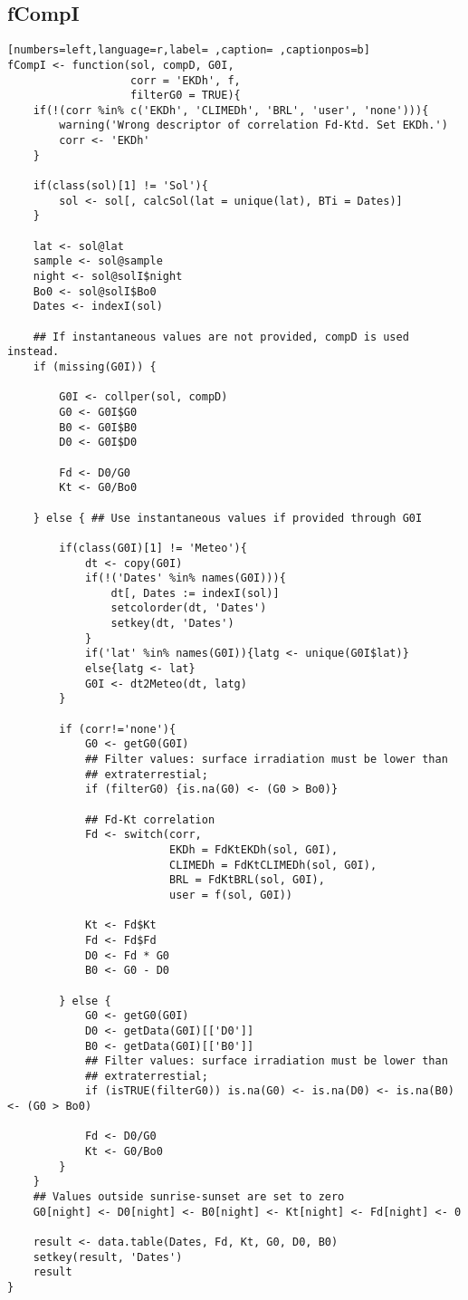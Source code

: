 \subsection{fCompI}
\label{sec:org1c50b28}
\begin{lstlisting}[numbers=left,language=r,label= ,caption= ,captionpos=b]
fCompI <- function(sol, compD, G0I,
                   corr = 'EKDh', f,
                   filterG0 = TRUE){
    if(!(corr %in% c('EKDh', 'CLIMEDh', 'BRL', 'user', 'none'))){
        warning('Wrong descriptor of correlation Fd-Ktd. Set EKDh.')
        corr <- 'EKDh'
    }

    if(class(sol)[1] != 'Sol'){
        sol <- sol[, calcSol(lat = unique(lat), BTi = Dates)]
    }

    lat <- sol@lat
    sample <- sol@sample
    night <- sol@solI$night
    Bo0 <- sol@solI$Bo0
    Dates <- indexI(sol)

    ## If instantaneous values are not provided, compD is used instead.
    if (missing(G0I)) { 

        G0I <- collper(sol, compD)
        G0 <- G0I$G0
        B0 <- G0I$B0
        D0 <- G0I$D0

        Fd <- D0/G0
        Kt <- G0/Bo0

    } else { ## Use instantaneous values if provided through G0I

        if(class(G0I)[1] != 'Meteo'){
            dt <- copy(G0I)
            if(!('Dates' %in% names(G0I))){
                dt[, Dates := indexI(sol)]
                setcolorder(dt, 'Dates')
                setkey(dt, 'Dates')
            }
            if('lat' %in% names(G0I)){latg <- unique(G0I$lat)}
            else{latg <- lat}
            G0I <- dt2Meteo(dt, latg)
        }

        if (corr!='none'){
            G0 <- getG0(G0I)
            ## Filter values: surface irradiation must be lower than
            ## extraterrestial; 
            if (filterG0) {is.na(G0) <- (G0 > Bo0)}

            ## Fd-Kt correlation
            Fd <- switch(corr,
                         EKDh = FdKtEKDh(sol, G0I),
                         CLIMEDh = FdKtCLIMEDh(sol, G0I),
                         BRL = FdKtBRL(sol, G0I), 
                         user = f(sol, G0I))

            Kt <- Fd$Kt
            Fd <- Fd$Fd
            D0 <- Fd * G0
            B0 <- G0 - D0

        } else { 
            G0 <- getG0(G0I)
            D0 <- getData(G0I)[['D0']]
            B0 <- getData(G0I)[['B0']]
            ## Filter values: surface irradiation must be lower than
            ## extraterrestial; 
            if (isTRUE(filterG0)) is.na(G0) <- is.na(D0) <- is.na(B0) <- (G0 > Bo0)

            Fd <- D0/G0
            Kt <- G0/Bo0
        }
    }
    ## Values outside sunrise-sunset are set to zero
    G0[night] <- D0[night] <- B0[night] <- Kt[night] <- Fd[night] <- 0

    result <- data.table(Dates, Fd, Kt, G0, D0, B0)
    setkey(result, 'Dates')
    result
}
\end{lstlisting}
